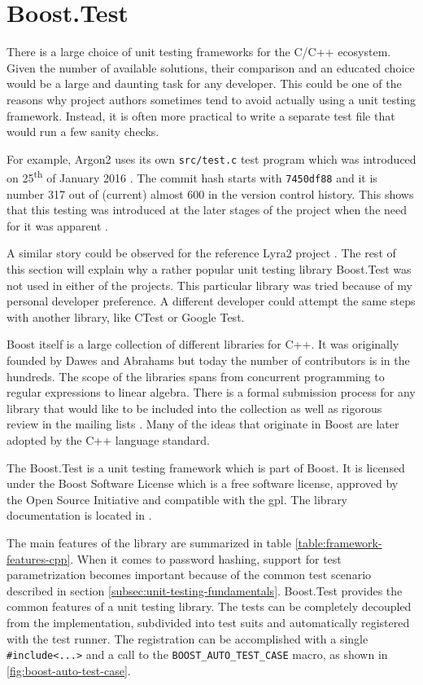 \section{Boost.Test}
\label{sec:unit-boost-google}

There is a large choice of unit testing frameworks for the C/C++ ecosystem. Given the number of available solutions, their comparison and an educated choice would be a large and daunting task for any developer. This could be one of the reasons why project authors sometimes tend to avoid actually using a unit testing framework. Instead, it is often more practical to write a separate test file that would run a few sanity checks.

For example, Argon2 uses its own \texttt{src/test.c} test program which was introduced on 25\textsuperscript{th} of January 2016 \cite{github:2017:argon2}. The commit hash starts with \texttt{7450df88} and it is number 317 out of (current) almost 600 in the version control history. This shows that this testing was introduced at the later stages of the project when the need for it was apparent \cite{github:2017:argon2-issue-85}.

A similar story could be observed for the reference Lyra2 project \cite{github:2017:lyra}. The rest of this section will explain why a rather popular unit testing library Boost.Test was not used in either of the projects. This particular library was tried because of my personal developer preference. A different developer could attempt the same steps with another library, like CTest or Google Test.

Boost itself is a large collection of different libraries for C++. It was originally founded by Dawes and Abrahams but today the number of contributors is in the hundreds. The scope of the libraries spans from concurrent programming to regular expressions to linear algebra. There is a formal submission process for any library that would like to be included into the collection \cite{boost:2017:submission-process} as well as rigorous review in the mailing lists \cite{boost:2017:mailing-list}. Many of the ideas that originate in Boost are later adopted by the C++ language standard.

The Boost.Test is a unit testing framework which is part of Boost. It is licensed under the Boost Software License which is a free software license, approved by the Open Source Initiative and compatible with the \gls{gpl}. The library documentation is located in \cite{boost:2017:test-docs}.

The main features of the library are summarized in table \ref{table:framework-features-cpp}. When it comes to password hashing, support for test parametrization becomes important because of the common test scenario described in section \ref{subsec:unit-testing-fundamentals}. Boost.Test provides the common features of a unit testing library. The tests can be completely decoupled from the implementation, subdivided  into test suits and automatically registered with the test runner. The registration can be accomplished with a single \texttt{\#include<...>} and a call to the \texttt{BOOST\_AUTO\_TEST\_CASE} macro, as shown in \autoref{fig:boost-auto-test-case}.

